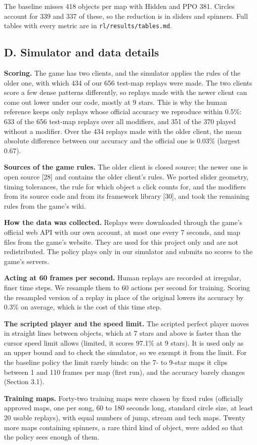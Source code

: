 \documentclass[10pt,a4paper]{article}
\begin{document}
The baseline misses 418 objects per map with Hidden and PPO 381. Circles account for 339 and 337 of these, so the reduction is in sliders and spinners. Full tables with every metric are in {\small\texttt{rl/\allowbreak{}results/\allowbreak{}tables.md}}.


\subsection*{D. Simulator and data details}

\textbf{Scoring.} The game has two clients, and the simulator applies the rules of the older one, with which 434 of our 656 test-map replays were made. The two clients score a few dense patterns differently, so replays made with the newer client can come out lower under our code, mostly at 9 stars. This is why the human reference keeps only replays whose official accuracy we reproduce within 0.5\%: 633 of the 656 test-map replays over all modifiers, and 351 of the 370 played without a modifier. Over the 434 replays made with the older client, the mean absolute difference between our accuracy and the official one is 0.03\% (largest 0.67).


\textbf{Sources of the game rules.} The older client is closed source; the newer one is open source [28] and contains the older client's rules. We ported slider geometry, timing tolerances, the rule for which object a click counts for, and the modifiers from its source code and from its framework library [30], and took the remaining rules from the game's wiki.


\textbf{How the data was collected.} Replays were downloaded through the game's official web API with our own account, at most one every 7 seconds, and map files from the game's website. They are used for this project only and are not redistributed. The policy plays only in our simulator and submits no scores to the game's servers.


\textbf{Acting at 60 frames per second.} Human replays are recorded at irregular, finer time steps. We resample them to 60 actions per second for training. Scoring the resampled version of a replay in place of the original lowers its accuracy by 0.3\% on average, which is the cost of this time step.


\textbf{The scripted player and the speed limit.} The scripted perfect player moves in straight lines between objects, which at 7 stars and above is faster than the cursor speed limit allows (limited, it scores 97.1\% at 9 stars). It is used only as an upper bound and to check the simulator, so we exempt it from the limit. For the baseline policy the limit rarely binds: on the 7- to 9-star maps it clips between 1 and 110 frames per map (first run), and the accuracy barely changes (Section 3.1).


\textbf{Training maps.} Forty-two training maps were chosen by fixed rules (officially approved maps, one per song, 60 to 180 seconds long, standard circle size, at least 20 usable replays), with equal numbers of jump, stream and tech maps. Twenty more maps containing spinners, a rare third kind of object, were added so that the policy sees enough of them.

\end{document}
